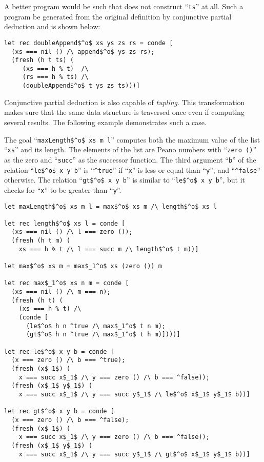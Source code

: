 A better program would be such that does not construct ``\lstinline{ts}'' at all. 
Such a program be generated from the original definition by conjunctive partial deduction and is shown below: 

\begin{lstlisting}[label={cpd:doubleappendo}]
let rec doubleAppend$^o$ xs ys zs rs = conde [
  (xs === nil () /\ append$^o$ ys zs rs);
  (fresh (h t ts) (
     (xs === h % t)  /\  
     (rs === h % ts) /\
     (doubleAppend$^o$ t ys zs ts)))]
\end{lstlisting}


Conjunctive partial deduction is also capable of \emph{tupling}. 
This transformation makes sure that the same data structure is traversed once even if computing several results. 
The following example demonstrates such a case. 

The goal ``\lstinline{maxLength$^o$ xs m l}'' computes both the maximum value of the list ``\lstinline{xs}'' and its length. 
The elements of the list are Peano numbers with ``\lstinline{zero ()}'' as the zero and ``\lstinline{succ}'' as the successor function.
The third argument ``\lstinline{b}'' of the relation ``\lstinline{le$^o$ x y b}'' is ``\lstinline{^true}'' if ``\lstinline{x}'' is less or equal than ``\lstinline{y}'', and ``\lstinline{^false}'' otherwise. The relation ``\lstinline{gt$^o$ x y b}'' is similar to ``\lstinline{le$^o$ x y b}'', but it checks for ``\lstinline{x}'' to be greater than ``\lstinline{y}''. 

\begin{lstlisting}[label={cpd:maxandlength}]
let maxLength$^o$ xs m l = max$^o$ xs m /\ length$^o$ xs l

let rec length$^o$ xs l = conde [
  (xs === nil () /\ l === zero ());
  (fresh (h t m) (
    xs === h % t /\ l === succ m /\ length$^o$ t m))]

let max$^o$ xs m = max$_1^o$ xs (zero ()) m

let rec max$_1^o$ xs n m = conde [
  (xs === nil () /\ m === n);
  (fresh (h t) (
    (xs === h % t) /\
    (conde [
      (le$^o$ h n ^true /\ max$_1^o$ t n m); 
      (gt$^o$ h n ^true /\ max$_1^o$ t h m)])))]

let rec le$^o$ x y b = conde [
  (x === zero () /\ b === ^true); 
  (fresh (x$_1$) (
    x === succ x$_1$ /\ y === zero () /\ b === ^false)); 
  (fresh (x$_1$ y$_1$) (
    x === succ x$_1$ /\ y === succ y$_1$ /\ le$^o$ x$_1$ y$_1$ b))]

let rec gt$^o$ x y b = conde [
  (x === zero () /\ b === ^false);
  (fresh (x$_1$) (
    x === succ x$_1$ /\ y === zero () /\ b === ^false));
  (fresh (x$_1$ y$_1$) (
    x === succ x$_1$ /\ y === succ y$_1$ /\ gt$^o$ x$_1$ y$_1$ b))]
\end{lstlisting}


